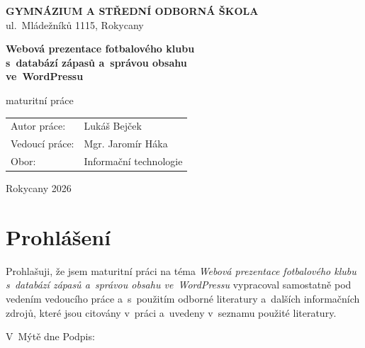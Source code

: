 \documentclass[12pt,a4paper]{article}
\begin{document}
\raggedbottom

\begin{titlepage}
\begin{center}

\vspace*{0.5cm}
{\sffamily\Large\bfseries GYMNÁZIUM A STŘEDNÍ ODBORNÁ ŠKOLA}\\[4pt]
{\sffamily\large ul.\ Mládežníků 1115, Rokycany}

\vfill

{\sffamily\huge\bfseries Webová prezentace fotbalového klubu\\[6pt]
s~databází zápasů a~správou obsahu\\[6pt]
ve~WordPressu}

\vspace{1.5cm}

{\sffamily\Large maturitní práce}

\vfill

{\large
\begin{tabular}{@{}ll@{}}
Autor práce: & Lukáš Bejček \\
Vedoucí práce: & Mgr. Jaromír Háka \\
Obor: & Informační technologie \\
\end{tabular}
}

\vspace{1.5cm}

{\large Rokycany 2026}

\end{center}
\end{titlepage}

\thispagestyle{empty}
\section*{Prohlášení}

Prohlašuji, že jsem maturitní práci na téma \textit{Webová prezentace fotbalového klubu s~databází zápasů a~správou obsahu ve~WordPressu} vypracoval samostatně pod vedením vedoucího práce a~s~použitím odborné literatury a~dalších informačních zdrojů, které jsou citovány v~práci a~uvedeny v~seznamu použité literatury.

\vspace{2cm}

V~Mýtě dne \dotfill{} Podpis: \dotfill{}

\newpage
\end{document}
